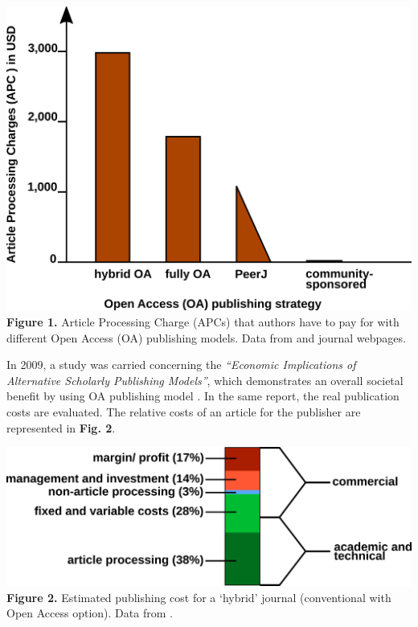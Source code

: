\documentclass[10pt,fleqn]{wlpeerj}
\begin{document}
\includegraphics{fig-OA-strategies-APCs.png}
\textbf{Figure
1.}
Article
Processing
Charge
(APCs)
that
authors
have
to
pay
for
with
different
Open
Access
(OA)
publishing
models.
Data
from
\citep{solomon_article_2016}
and
journal
webpages.

In
2009,
a
study
was
carried
concerning
the
\emph{``Economic
Implications
of
Alternative
Scholarly
Publishing
Models''},
which
demonstrates
an
overall
societal
benefit
by
using
OA
publishing
model
\citep{houghton_economic_2009}.
In
the
same
report,
the
real
publication
costs
are
evaluated.
The
relative
costs
of an
article
for
the
publisher
are
represented
in
\textbf{Fig.
2}.

\includegraphics{fig-hybrid-publishing-costs.png}
\textbf{Figure
2.}
Estimated
publishing
cost
for a
`hybrid'
journal
(conventional
with
Open
Access
option).
Data
from
\citep{houghton_economic_2009}.
\end{document}
